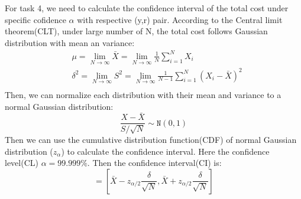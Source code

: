 \documentclass[letterpaper, 10 pt, conference]{ieeeconf}
\begin{document}
For task 4, we need to calculate the confidence interval of the total cost under specific cofidence $\alpha$ with respective (y,r) pair. According to the Central limit theorem(CLT), under large number of N, the total cost follows Gaussian distribution with mean an variance:
\begin{equation}
  \begin{split}
    & \mu =\lim\limits_{N \to \infty } \bar{X} = \lim\limits_{N \to \infty } \frac{1}{N}\sum_{i=1}^{N}X_i \\
    & \delta^2 =\lim\limits_{N \to \infty } S^2 = \lim\limits_{N \to \infty } \frac{1}{N-1}\sum_{i=1}^{N}(X_i-\bar{X})^2\\
  \end{split}
\end{equation}
Then, we can normalize each distribution with their mean and variance to a normal Gaussian distribution:
\begin{equation}
  \frac{X-\bar{X}}{S/\sqrt{N}} \sim  \mathtt{N}(0,1)
\end{equation}
Then we can use the cumulative distribution function(CDF) of normal Gaussian distribution ($z_\alpha$) to calculate the confidence interval. Here the confidence level(CL) $\alpha=99.999\%$. Then the confidence interval(CI) is:
\begin{equation}
  [L(X),U(X)] = [\bar{X}-z_{\alpha/2}\frac{\delta}{\sqrt{N}},\bar{X}+z_{\alpha/2}\frac{\delta}{\sqrt{N}}]
\end{equation}
\end{document}
